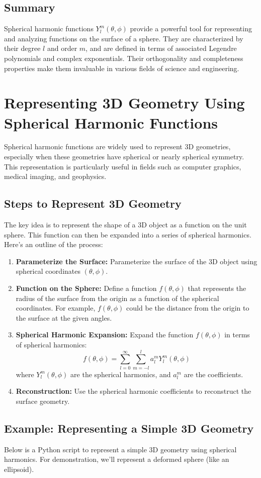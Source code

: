 \subsection*{Summary}

Spherical harmonic functions \( Y_l^m(\theta, \phi) \) provide a powerful tool for representing and analyzing functions on the surface of a sphere. They are characterized by their degree \( l \) and order \( m \), and are defined in terms of associated Legendre polynomials and complex exponentials. Their orthogonality and completeness properties make them invaluable in various fields of science and engineering.


\section*{Representing 3D Geometry Using Spherical Harmonic Functions}

Spherical harmonic functions are widely used to represent 3D geometries, especially when these geometries have spherical or nearly spherical symmetry. This representation is particularly useful in fields such as computer graphics, medical imaging, and geophysics.

\subsection*{Steps to Represent 3D Geometry}

The key idea is to represent the shape of a 3D object as a function on the unit sphere. This function can then be expanded into a series of spherical harmonics. Here's an outline of the process:

\begin{enumerate}
	\item \textbf{Parameterize the Surface:} Parameterize the surface of the 3D object using spherical coordinates \((\theta, \phi)\).
	\item \textbf{Function on the Sphere:} Define a function \( f(\theta, \phi) \) that represents the radius of the surface from the origin as a function of the spherical coordinates. For example, \( f(\theta, \phi) \) could be the distance from the origin to the surface at the given angles.
	\item \textbf{Spherical Harmonic Expansion:} Expand the function \( f(\theta, \phi) \) in terms of spherical harmonics:
	\[
	f(\theta, \phi) = \sum_{l=0}^{\infty} \sum_{m=-l}^{l} a_l^m Y_l^m(\theta, \phi)
	\]
	where \( Y_l^m(\theta, \phi) \) are the spherical harmonics, and \( a_l^m \) are the coefficients.
	\item \textbf{Reconstruction:} Use the spherical harmonic coefficients to reconstruct the surface geometry.
\end{enumerate}

\subsection*{Example: Representing a Simple 3D Geometry}

Below is a Python script to represent a simple 3D geometry using spherical harmonics. For demonstration, we'll represent a deformed sphere (like an ellipsoid).

	
